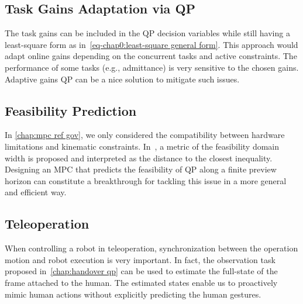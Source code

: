 	\subsection*{Task Gains Adaptation via QP} 
	The task gains can be included in the QP decision variables while still having a least-square form as in~\cref{eq-chap0:least-square general form}. This approach would adapt online gains depending on the concurrent tasks and active constraints. The performance of some tasks (e.g., admittance) is very sensitive to the chosen gains. Adaptive gains QP can be a nice solution to mitigate such issues.
	\subsection*{Feasibility Prediction}
In \cref{chap:mpc ref gov}, we only considered the compatibility between hardware limitations and kinematic constraints. In~\cite{morris2013cdc}, a metric of the feasibility domain width is proposed and interpreted as the distance to the closest inequality. Designing an MPC that predicts the feasibility of QP along a finite preview horizon can constitute a breakthrough for tackling this issue in a more general and efficient way.
	\subsection*{Teleoperation}
	When controlling a robot in teleoperation, synchronization between the operation motion and robot execution is very important. In fact, the observation task proposed in~\cref{chap:handover qp} can be used to estimate the full-state of the frame attached to the human. The estimated states enable us to proactively mimic human actions without explicitly predicting the human gestures.   
